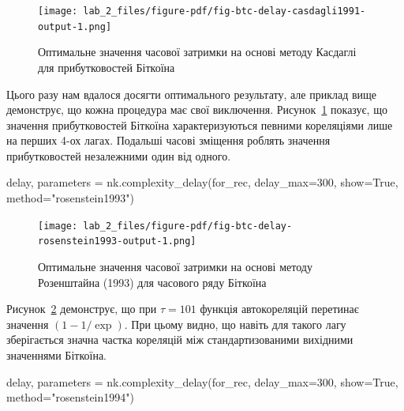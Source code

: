 \documentclass[
  letterpaper,
]{report}
\newenvironment{Shaded}{\begin{snugshade}}{\end{snugshade}}
\newcommand{\DecValTok}[1]{\textcolor[rgb]{0.68,0.00,0.00}{#1}}
\newcommand{\NormalTok}[1]{\textcolor[rgb]{0.00,0.23,0.31}{#1}}
\newcommand{\OperatorTok}[1]{\textcolor[rgb]{0.37,0.37,0.37}{#1}}
\newcommand{\StringTok}[1]{\textcolor[rgb]{0.13,0.47,0.30}{#1}}
\newcommand{\VariableTok}[1]{\textcolor[rgb]{0.07,0.07,0.07}{#1}}
\begin{document}
\begin{figure}[H]

{\centering \texttt{[image: lab\_2\_files/figure-pdf/fig-btc-delay-casdagli1991-output-1.png]}

}

\caption{\label{fig-btc-delay-casdagli1991}Оптимальне значення часової
затримки на основі методу Касдаглі для прибутковостей Біткоїна}

\end{figure}

Цього разу нам вдалося досягти оптимального результату, але приклад вище
демонструє, що кожна процедура має свої виключення.
Рисунок~\ref{fig-btc-delay-casdagli1991} показує, що значення
прибутковостей Біткоїна характеризуються певними кореляціями лише на
перших 4-ох лагах. Подальші часові зміщення роблять значення
прибутковостей незалежними один від одного.

\begin{Shaded}
\begin{Highlighting}[]
\NormalTok{delay, parameters }\OperatorTok{=}\NormalTok{ nk.complexity\_delay(for\_rec, }
\NormalTok{                                        delay\_max}\OperatorTok{=}\DecValTok{300}\NormalTok{, show}\OperatorTok{=}\VariableTok{True}\NormalTok{,}
\NormalTok{                                        method}\OperatorTok{=}\StringTok{"rosenstein1993"}\NormalTok{)}
\end{Highlighting}
\end{Shaded}

\begin{figure}[H]

{\centering \texttt{[image: lab\_2\_files/figure-pdf/fig-btc-delay-rosenstein1993-output-1.png]}

}

\caption{\label{fig-btc-delay-rosenstein1993}Оптимальне значення часової
затримки на основі методу Розенштайна (1993) для часового ряду Біткоїна}

\end{figure}

Рисунок~\ref{fig-btc-delay-rosenstein1993} демонструє, що при
\(\tau=101\) функція автокореляцій перетинає значення
\(\left( 1-1/\exp \right)\). При цьому видно, що навіть для такого лагу
зберігається значна частка кореляцій між стандартизованими вихідними
значеннями Біткоїна.

\begin{Shaded}
\begin{Highlighting}[]
\NormalTok{delay, parameters }\OperatorTok{=}\NormalTok{ nk.complexity\_delay(for\_rec, }
\NormalTok{                                        delay\_max}\OperatorTok{=}\DecValTok{300}\NormalTok{, show}\OperatorTok{=}\VariableTok{True}\NormalTok{,}
\NormalTok{                                        method}\OperatorTok{=}\StringTok{"rosenstein1994"}\NormalTok{)}
\end{Highlighting}
\end{Shaded}
\end{document}

